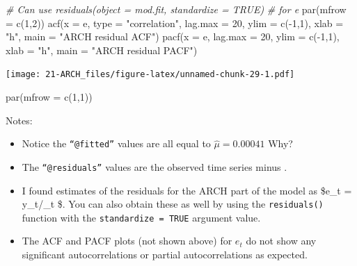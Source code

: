 \documentclass[
]{book}
\newenvironment{Shaded}{\begin{snugshade}}{\end{snugshade}}
\newcommand{\AttributeTok}[1]{\textcolor[rgb]{0.77,0.63,0.00}{#1}}
\newcommand{\CommentTok}[1]{\textcolor[rgb]{0.56,0.35,0.01}{\textit{#1}}}
\newcommand{\DecValTok}[1]{\textcolor[rgb]{0.00,0.00,0.81}{#1}}
\newcommand{\FunctionTok}[1]{\textcolor[rgb]{0.00,0.00,0.00}{#1}}
\newcommand{\NormalTok}[1]{#1}
\newcommand{\SpecialCharTok}[1]{\textcolor[rgb]{0.00,0.00,0.00}{#1}}
\newcommand{\StringTok}[1]{\textcolor[rgb]{0.31,0.60,0.02}{#1}}
\providecommand{\tightlist}{%
  \setlength{\itemsep}{0pt}\setlength{\parskip}{0pt}}
\theoremstyle{definition}
\theoremstyle{definition}
\theoremstyle{definition}
\theoremstyle{definition}
\theoremstyle{remark}
\begin{document}
\begin{Shaded}
\begin{Highlighting}[]
\CommentTok{\# Can use residuals(object = mod.fit, standardize = TRUE) }
\CommentTok{\# for e}
\FunctionTok{par}\NormalTok{(}\AttributeTok{mfrow =} \FunctionTok{c}\NormalTok{(}\DecValTok{1}\NormalTok{,}\DecValTok{2}\NormalTok{))}
\FunctionTok{acf}\NormalTok{(}\AttributeTok{x =}\NormalTok{ e, }\AttributeTok{type =} \StringTok{"correlation"}\NormalTok{, }\AttributeTok{lag.max =} \DecValTok{20}\NormalTok{, }\AttributeTok{ylim =} 
    \FunctionTok{c}\NormalTok{(}\SpecialCharTok{{-}}\DecValTok{1}\NormalTok{,}\DecValTok{1}\NormalTok{), }\AttributeTok{xlab =} \StringTok{"h"}\NormalTok{, }\AttributeTok{main =} \StringTok{"ARCH residual ACF"}\NormalTok{) }
\FunctionTok{pacf}\NormalTok{(}\AttributeTok{x =}\NormalTok{ e, }\AttributeTok{lag.max =} \DecValTok{20}\NormalTok{, }\AttributeTok{ylim =} \FunctionTok{c}\NormalTok{(}\SpecialCharTok{{-}}\DecValTok{1}\NormalTok{,}\DecValTok{1}\NormalTok{), }\AttributeTok{xlab =} \StringTok{"h"}\NormalTok{,}
    \AttributeTok{main =} \StringTok{"ARCH residual PACF"}\NormalTok{)}
\end{Highlighting}
\end{Shaded}

\texttt{[image: 21-ARCH\_files/figure-latex/unnamed-chunk-29-1.pdf]}

\begin{Shaded}
\begin{Highlighting}[]
\FunctionTok{par}\NormalTok{(}\AttributeTok{mfrow =} \FunctionTok{c}\NormalTok{(}\DecValTok{1}\NormalTok{,}\DecValTok{1}\NormalTok{))}
\end{Highlighting}
\end{Shaded}

Notes:

\begin{itemize}
\tightlist
\item
  Notice the \texttt{“@fitted”} values are all equal to \(\hat \mu = 0.00041\) Why?
\item
  The \texttt{“@residuals”} values are the observed time series minus .\\
\item
  I found estimates of the residuals for the ARCH part of the model as \$e\_t = y\_t/\hat \sigma\_t \$. You can also obtain these as well by using the \texttt{residuals()} function with the \texttt{standardize\ =\ TRUE} argument value.
\item
  The ACF and PACF plots (not shown above) for \(e_t\) do not show any significant autocorrelations or partial autocorrelations as expected.
\end{itemize}
\end{document}
